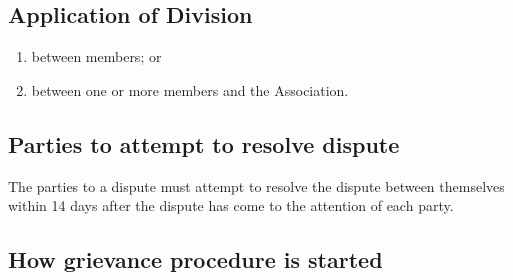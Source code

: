 \documentclass[../constitution.tex]{subfiles}
\begin{document}
\hypertarget{application-of-division}{%
\subsection{Application of Division}\label{application-of-division}}


\begin{enumerate}
  \def\labelenumi{\alph{enumi})}
  \setcounter{enumi}{0}
  \item between members; or
  \item between one or more members and the Association.
\end{enumerate}

\hypertarget{parties-to-attempt-to-resolve-dispute}{%
\subsection{Parties to attempt to resolve dispute}\label{parties-to-attempt-to-resolve-dispute}}

The parties to a dispute must attempt to resolve the dispute between themselves within 14 days after the dispute has come to the attention of each party.

\hypertarget{how-grievance-procedure-is-started}{%
\subsection{How grievance procedure is started}\label{how-grievance-procedure-is-started}}
\end{document}
